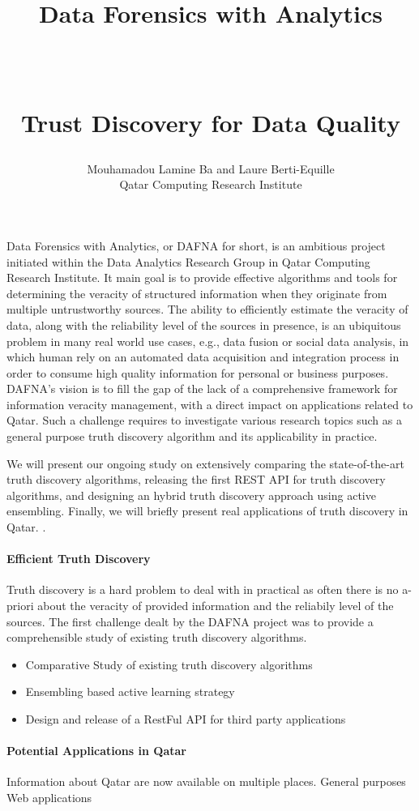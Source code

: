 \documentclass[paper=a4, fontsize=11pt]{scrartcl}	%
\title{ \vspace{-1in} 	\usefont{OT1}{bch}{b}{n}
		\huge \strut Data Forensics with Analytics\strut \\
		\Large \bfseries \strut Trust Discovery for Data Quality\strut
}
\author{ 									\usefont{OT1}{bch}{m}{n}
        Mouhamadou Lamine Ba and Laure Berti-Equille\\		\usefont{OT1}{bch}{m}{n}
        Qatar Computing Research Institute\\	\usefont{OT1}{bch}{m}{n}
}
\date{}
\numberwithin{equation}{section}															%
\numberwithin{figure}{section}																%
\numberwithin{table}{section}																%
\begin{document}
\maketitle
 
 Data Forensics with Analytics, or DAFNA for short, is an ambitious project initiated within the Data Analytics Research Group in Qatar Computing Research
 Institute. It main goal is to provide effective algorithms and tools for determining the veracity of structured information when they originate from  
 multiple untrustworthy sources. The ability to efficiently estimate the veracity of data, along with the reliability level of the sources in presence,
 is an ubiquitous problem in many real world use cases, e.g., data fusion or social data analysis, in which human rely on an automated data acquisition
 and integration process in order to consume high quality information for personal or business purposes. DAFNA's vision is to fill the gap of the  lack of 
 a comprehensive framework for information veracity management, with a direct impact on applications related to Qatar. Such a challenge requires to investigate
 various research topics such as a general purpose truth discovery algorithm and its applicability in practice.

We will present our ongoing study on extensively comparing the state-of-the-art truth discovery algorithms, releasing the first REST API for truth discovery algorithms,
and designing an hybrid truth discovery approach using active ensembling. Finally, we will briefly present real applications of truth discovery in Qatar.
.
 
 \paragraph*{Efficient Truth Discovery}Truth discovery is a hard problem to deal with in practical as often there is no a-priori
 about the veracity of provided information and the reliabily level of the sources. 
 The first challenge dealt by the DAFNA project was to provide a comprehensible study of existing
 truth discovery algorithms. 
 
 \begin{itemize}
  \item Comparative Study of existing truth discovery algorithms
  \item Ensembling based active learning strategy 
  \item Design and release of a RestFul API for third party applications
 \end{itemize}
 \paragraph*{Potential Applications in Qatar}Information about Qatar are now available on multiple places. General 
 purposes Web applications 
\end{document}
